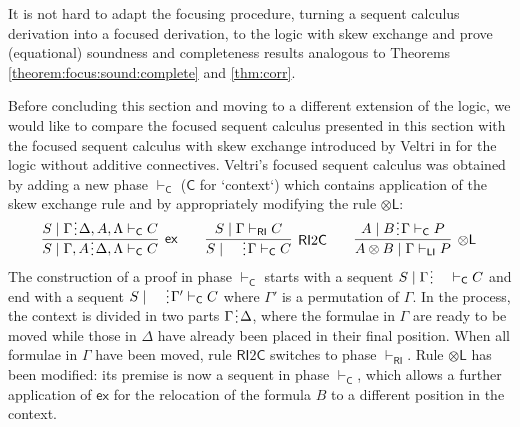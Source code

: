 \documentclass[submission,copyright,creativecommons]{eptcs}
\theoremstyle{definition}
\newcommand{\tl}{\otimes \mathsf{L}}
\newcommand{\ot}{\otimes}
\newcommand{\C}{\mathsf{C}}
\newcommand{\RI}{\mathsf{RI}}
\newcommand{\LI}{\mathsf{LI}}
\newcommand{\ex}{\mathsf{ex}}
\newcommand{\spl}{\raisebox{-1.5pt}[0.5\height]{\hspace{1pt}\vdots\hspace{1pt}}}
\begin{document}
It is not hard to adapt the focusing procedure, turning a sequent calculus derivation into a focused derivation, to the logic with skew exchange and prove (equational) soundness and completeness results analogous to Theorems \ref{theorem:focus:sound:complete} and \ref{thm:corr}.

Before concluding this section and moving to a different extension of the logic, we would like to compare the focused sequent calculus presented in this section with the focused sequent calculus with skew exchange introduced by Veltri in \cite{veltri:coherence:2021,Veltri25} for the logic without additive connectives. Veltri's focused sequent calculus was obtained by adding a new phase $\vdash_\C$ ($\C$ for `context`) which contains application of the skew exchange rule and by appropriately modifying the rule $\tl$:
\begin{equation}\label{eq:focus:sym}
  \begin{array}{c}
      \infer[\ex]{S \mid \Gamma , A \spl \Delta , \Lambda \vdash_{\C} C}{S \mid \Gamma \spl \Delta , A , \Lambda \vdash_{\C} C}
      \qquad
      \infer[\RI 2 \C]{S \mid \quad \spl \Gamma \vdash_{\C} C}{S \mid \Gamma \vdash_{\RI} C}
    \qquad
    \infer[\tl]{A \ot B \mid \Gamma \vdash_{\LI} P}{A \mid B \spl \Gamma \vdash_{\C} P}
  \end{array}
\end{equation}
The construction of a proof in phase $\vdash_\C$ starts with a sequent $S \mid \Gamma \spl \quad \vdash_{\C}C$ and end with a sequent $S \mid \quad \spl \Gamma' \vdash_{\C}C$ where $\Gamma'$ is a permutation of $\Gamma$. 
  In the process, the context is divided in two parts $\Gamma \spl \Delta$, where the formulae in $\Gamma$ are ready to be moved while those in $\Delta$ have already been placed in their final position.
  When all formulae in $\Gamma$ have been moved, rule $\RI 2 \C$ switches to phase $\vdash_\RI$. 
 Rule $\tl$ has been modified: its premise is now a sequent in phase $\vdash_\C$, which allows a further application of $\ex$ for the relocation of the formula $B$ to a different position in the context.
\end{document}

